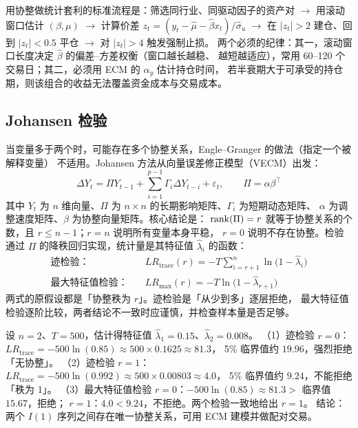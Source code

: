 \begin{appbox}[配对交易的执行清单]
用协整做统计套利的标准流程是：筛选同行业、同驱动因子的资产对 $\to$ 用滚动窗口估计
$(\beta,\mu)$ $\to$ 计算价差 $z_t=(y_t-\hat\mu-\hat\beta x_t)/\hat\sigma_u$ $\to$
在 $|z_t|>2$ 建仓、回到 $|z_t|<0.5$ 平仓 $\to$ 对 $|z_t|>4$ 触发强制止损。
两个必须的纪律：其一，滚动窗口长度决定 $\hat\beta$ 的偏差--方差权衡（窗口越长越稳、
越短越适应），常用 60--120 个交易日；其二，必须用 ECM 的 $\alpha_y$ 估计持仓时间，
若半衰期大于可承受的持仓期，则该组合的收益无法覆盖资金成本与交易成本。
\end{appbox}

\subsection{Johansen 检验}

当变量多于两个时，可能存在多个协整关系，Engle--Granger 的做法（指定一个被解释变量）
不适用。Johansen 方法从向量误差修正模型（VECM）出发：
\begin{equation}\label{eq:09-vecm}
  \Delta Y_t=\Pi Y_{t-1}+\sum_{i=1}^{p-1}\Gamma_i\Delta Y_{t-i}+\varepsilon_t,\qquad
  \Pi=\alpha\beta^{\top}
\end{equation}
其中 $Y_t$ 为 $n$ 维向量、$\Pi$ 为 $n\times n$ 的长期影响矩阵、$\Gamma_i$ 为短期动态矩阵、
$\alpha$ 为调整速度矩阵、$\beta$ 为协整向量矩阵。核心结论是：
$\operatorname{rank}(\Pi)=r$ 就等于协整关系的个数，且 $r\le n-1$；$r=n$ 说明所有变量本身平稳，
$r=0$ 说明不存在协整。检验通过 $\Pi$ 的降秩回归实现，统计量是其特征值 $\hat\lambda_i$ 的函数：
\begin{align}
  \text{迹检验：}\quad & LR_{\text{trace}}(r)=-T\sum_{i=r+1}^{n}\ln\bigl(1-\hat\lambda_i\bigr)\label{eq:09-trace}\\
  \text{最大特征值检验：}\quad & LR_{\max}(r)=-T\ln\bigl(1-\hat\lambda_{r+1}\bigr)\label{eq:09-maxeig}
\end{align}
两式的原假设都是「协整秩为 $r$」。迹检验是「从少到多」逐层拒绝，
最大特征值检验逐阶比较，两者结论不一致时应谨慎，并检查样本量是否足够。

\begin{example}\label{ex:09-johansen}
设 $n=2$、$T=500$，估计得特征值 $\hat\lambda_1=0.15$、$\hat\lambda_2=0.008$。
（1）迹检验 $r=0$：$LR_{\text{trace}}=-500\ln(0.85)\approx 500\times 0.1625\approx 81.3$，
5\% 临界值约 $19.96$，强烈拒绝「无协整」。
（2）迹检验 $r=1$：$LR_{\text{trace}}=-500\ln(0.992)\approx 500\times 0.00803\approx 4.0$，
5\% 临界值约 $9.24$，不能拒绝「秩为 1」。
（3）最大特征值检验 $r=0$：$-500\ln(0.85)\approx 81.3>$ 临界值 $15.67$，拒绝；
$r=1$：$4.0<9.24$，不拒绝。两个检验一致地给出 $r=1$。
结论：两个 $I(1)$ 序列之间存在唯一协整关系，可用 ECM 建模并做配对交易。
\end{example}

